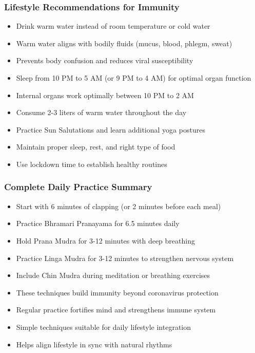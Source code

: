 \begin{frame}[fragile]\frametitle{Lifestyle Recommendations for Immunity}
      \begin{itemize}
	\item Drink warm water instead of room temperature or cold water
	\item Warm water aligns with bodily fluids (mucus, blood, phlegm, sweat)
	\item Prevents body confusion and reduces viral susceptibility
	\item Sleep from 10 PM to 5 AM (or 9 PM to 4 AM) for optimal organ function
	\item Internal organs work optimally between 10 PM to 2 AM
	\item Consume 2-3 liters of warm water throughout the day
	\item Practice Sun Salutations and learn additional yoga postures
	\item Maintain proper sleep, rest, and right type of food
	\item Use lockdown time to establish healthy routines
	  \end{itemize}
\end{frame}

\begin{frame}[fragile]\frametitle{Complete Daily Practice Summary}
      \begin{itemize}
	\item Start with 6 minutes of clapping (or 2 minutes before each meal)
	\item Practice Bhramari Pranayama for 6.5 minutes daily
	\item Hold Prana Mudra for 3-12 minutes with deep breathing
	\item Practice Linga Mudra for 3-12 minutes to strengthen nervous system
	\item Include Chin Mudra during meditation or breathing exercises
	\item These techniques build immunity beyond coronavirus protection
	\item Regular practice fortifies mind and strengthens immune system
	\item Simple techniques suitable for daily lifestyle integration
	\item Helps align lifestyle in sync with natural rhythms
	  \end{itemize}
\end{frame}